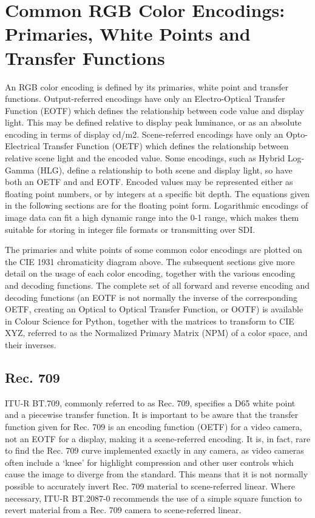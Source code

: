 \section{Common RGB Color Encodings: Primaries, White Points and Transfer Functions}





An RGB color encoding is defined by its primaries, white point and transfer functions. Output-referred encodings have only an Electro-Optical Transfer Function (EOTF) which defines the relationship between code value and display light. This may be defined relative to display peak luminance, or as an absolute encoding in terms of display cd/m2. Scene-referred encodings have only an Opto-Electrical Transfer Function (OETF) which defines the relationship between relative scene light and the encoded value. Some encodings, such as Hybrid Log-Gamma (HLG), define a relationship to both scene and display light, so have both an OETF and and EOTF. Encoded values may be represented either as floating point numbers, or by integers at a specific bit depth. The equations given in the following sections are for the floating point form. Logarithmic encodings of image data can fit a high dynamic range into the 0-1 range, which makes them suitable for storing in integer file formats or transmitting over SDI.

The primaries and white points of some common color encodings are plotted on the CIE 1931 chromaticity diagram above. The subsequent sections give more detail on the usage of each color encoding, together with the various encoding and decoding functions. The complete set of all forward and reverse encoding and decoding functions (an EOTF is not normally the inverse of the corresponding OETF, creating an Optical to Optical Transfer Function, or OOTF) is available in Colour Science for Python, together with the matrices to transform to CIE XYZ, referred to as the Normalized Primary Matrix (NPM) of a color space, and their inverses.

\subsection{Rec. 709}

ITU-R BT.709, commonly referred to as Rec. 709, specifies a D65 white point and a piecewise transfer function. It is important to be aware that the transfer function given for Rec. 709 is an encoding function (OETF) for a video camera, not an EOTF for a display, making it a scene-referred encoding. It is, in fact, rare to find the Rec. 709 curve implemented exactly in any camera, as video cameras often include a ‘knee’ for highlight compression and other user controls which cause the image to diverge from the standard. This means that it is not normally possible to accurately invert Rec. 709 material to scene-referred linear. Where necessary, ITU-R BT.2087-0 recommends the use of a simple square function to revert material from a Rec. 709 camera to scene-referred linear.

